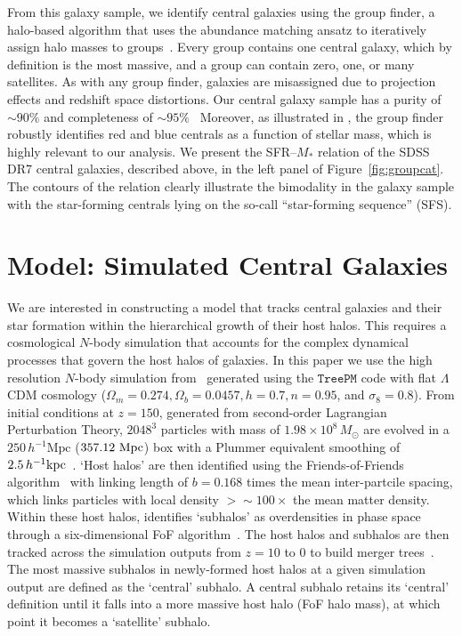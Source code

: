 \documentclass[12pt, letterpaper, preprint, tighten]{aastex62}
\newcommand{\edt}[1]{{\color{dred}{\bf} #1}}
\begin{document}
From this galaxy sample, we identify central galaxies using the
\cite{tinker2011} group finder, a halo-based algorithm that uses
the abundance matching ansatz to iteratively assign halo masses to
groups~\citep[see also][]{yang2005}. Every group contains one
central galaxy, which by definition is the most massive, and a group can
contain zero, one, or many satellites. As with any group finder, galaxies are misassigned due to projection
effects and redshift space distortions. Our central galaxy sample has
a purity of ${\sim}90\%$ and completeness of ${\sim}95\%$~\citep{tinker2018}
Moreover, as illustrated in \cite{campbell2015}, the \cite{tinker2011} group
finder robustly identifies red and blue centrals as a function of stellar mass,
which is highly relevant to our analysis.
We present the SFR--$M_*$ relation of the SDSS DR7 central galaxies, described
above, in the left panel of Figure~\ref{fig:groupcat}. The contours of the
relation clearly illustrate the bimodality in the galaxy sample with the
star-forming centrals lying on the so-call ``star-forming sequence'' (SFS).

\section{Model: Simulated Central Galaxies} \label{sec:sim}
We are interested in constructing a model that tracks central galaxies and
their star formation within the hierarchical growth of their host halos. This
requires a cosmological $N$-body simulation that accounts for the complex
dynamical processes that govern the host halos of galaxies. In this paper
we use the high resolution $N$-body simulation from~\cite{wetzel2013} generated
using the \cite{white2002} $\mathtt{TreePM}$ code with flat $\Lambda$CDM cosmology
($\Omega_m =0.274, \Omega_b = 0.0457, h = 0.7, n=0.95$, and $\sigma_8 = 0.8$).
From initial conditions at $z = 150$, generated from second-order Lagrangian
Perturbation Theory, $2048^3$ particles with mass of $1.98 \times 10^8\,M_\odot$ are
evolved in a $250\,h^{-1}\mathrm{Mpc}$ ($357.12~{\rm Mpc}$) box with a Plummer 
equivalent smoothing of $2.5\,h^{-1}{\rm kpc}$~\citep{wetzel2013, wetzel2014}. 
`Host halos' are then identified using the Friends-of-Friends algorithm~\citep[FoF;][]{davis1985} with
linking length of $b{=}0.168$ times the mean inter-partcile spacing,
\edt{which links particles with local density $>{\sim}100\times$ the mean matter density.}
Within these host halos, \cite{wetzel2013} identifies `subhalos' as overdensities
in phase space through a six-dimensional FoF algorithm~\citep[FoF6D;][]{white2010}.
The host halos and subhalos are then tracked across the simulation outputs
from $z = 10$ to $0$ to build merger trees~\citep{wetzel2009,wetzel2010}.
The most massive subhalos in newly-formed host halos at a given simulation
output are defined as the `central' subhalo. A central subhalo retains its
`central' definition until it falls into a more massive host halo
(FoF halo mass), at which point it becomes a `satellite' subhalo.
\end{document}
